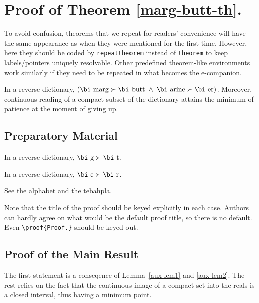 \documentclass[stsc,blindrev]{informs-stsc}
\begin{document}
\section{Proof of Theorem \ref{marg-butt-th}.}

To avoid confusion, theorems that we repeat for readers' convenience
will have the same appearance as when they were mentioned for the first
time. However, here they should be coded by \verb+repeattheorem+ instead
of \verb+theorem+ to keep labels/pointers uniquely resolvable. Other predefined theorem-like
environments work similarly if they need to be repeated in what becomes the \mbox{e-companion.}


\begin{repeattheorem}[Theorem 1.]
In a reverse dictionary, $(\mbox{\bi marg}\succ\mbox{\bi butt\/}\; \land\;  
\mbox{\bi arine}\succ\mbox{\bi er})$.
Moreover, continuous reading of a compact subset of the dictionary
attains the minimum of patience at the moment of giving up.
\end{repeattheorem}

\subsection{Preparatory Material}

\begin{lemma}
\label{aux-lem1}
In a reverse dictionary, $\mbox{\bi g}\succ\mbox{\bi t\/}$.
\end{lemma}

\begin{lemma}
\label{aux-lem2}
In a reverse dictionary, $\mbox{\bi e}\succ\mbox{\bi r\/}$.
\end{lemma}

 See the alphabet and the tebahpla.\Halmos
\endproof

\begin{remark} 
Note that the title of the proof should be keyed
explicitly in each case. Authors can hardly agree on what would be the
default proof title, so there is no default. Even \verb+\proof{Proof.}+ should be keyed out. 
\end{remark}


\subsection{Proof of the Main Result}

 The first statement is a conseqence of
Lemma~\ref{aux-lem1} and \ref{aux-lem2}. The rest relies on the fact that the continuous
image of a compact set into the reals is a closed interval, thus having
a minimum point.\Halmos 
\endproof
\end{document}
